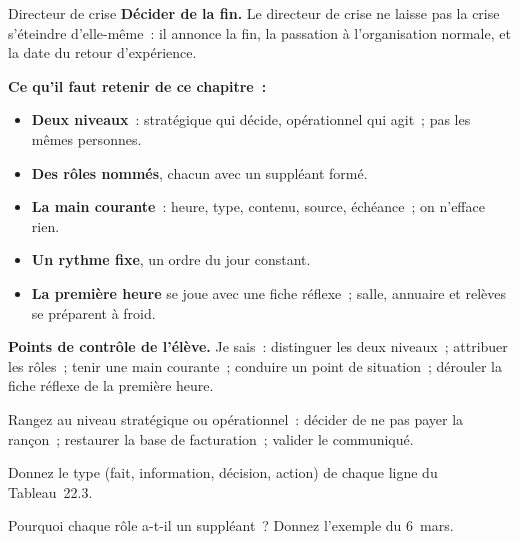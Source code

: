 \begin{boxmetier}{Directeur de crise}
\textbf{Décider de la fin.} Le directeur de crise ne laisse pas la crise
s'éteindre d'elle-même~: il annonce la fin, la passation à l'organisation
normale, et la date du retour d'expérience.
\end{boxmetier}

\separateur

\begin{boxresume}
\textbf{Ce qu'il faut retenir de ce chapitre~:}
\begin{itemize}
    \item \textbf{Deux niveaux}~: stratégique qui décide, opérationnel qui
          agit~; pas les mêmes personnes.
    \item \textbf{Des rôles nommés}, chacun avec un suppléant formé.
    \item \textbf{La main courante}~: heure, type, contenu, source,
          échéance~; on n'efface rien.
    \item \textbf{Un rythme fixe}, un ordre du jour constant.
    \item \textbf{La première heure} se joue avec une fiche réflexe~;
          salle, annuaire et relèves se préparent à froid.
\end{itemize}
\end{boxresume}

\begin{boxinfo}
\textbf{Points de contrôle de l'élève.} Je sais~: distinguer les deux
niveaux~; attribuer les rôles~; tenir une main courante~; conduire un
point de situation~; dérouler la fiche réflexe de la première heure.
\end{boxinfo}

\bigskip

\begin{boxexo}[title={\ding{45}\quad Exercice~22.1. Quel niveau~? \niveaubase}]
Rangez au niveau stratégique ou opérationnel~: décider de ne pas payer la
rançon~; restaurer la base de facturation~; valider le communiqué.
\end{boxexo}

\begin{boxexo}[title={\ding{45}\quad Exercice~22.2. Le type \niveaubase}]
Donnez le type (fait, information, décision, action) de chaque ligne du
Tableau~22.3.
\end{boxexo}

\begin{boxexo}[title={\ding{45}\quad Exercice~22.3. Les suppléants \niveaubase}]
Pourquoi chaque rôle a-t-il un suppléant~? Donnez l'exemple du 6~mars.
\end{boxexo}

